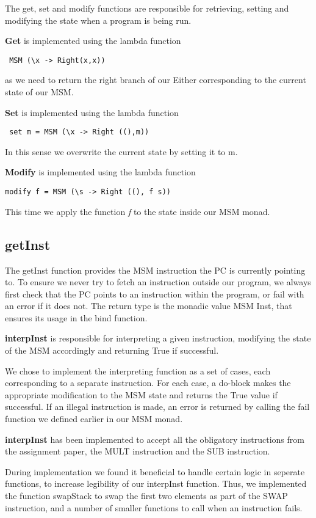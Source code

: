 \documentclass[]{article}
\begin{document}
The get, set and modify functions are responsible for retrieving, setting and modifying the state when a program is being run.\par

\textbf{Get} is implemented using the lambda function\begin{verbatim} MSM (\x -> Right(x,x)) \end{verbatim}as we need to return the right branch of our Either corresponding to the current state of our MSM.\par
\textbf{Set} is implemented using the lambda function\begin{verbatim} set m = MSM (\x -> Right ((),m))\end{verbatim} 
In this sense we overwrite the current state by setting it to m.\par
\textbf{Modify} is implemented using the lambda function \begin{verbatim}modify f = MSM (\s -> Right ((), f s))\end{verbatim} 
This time we apply the function \emph{f} to the state inside our MSM monad. \par

\subsection{getInst}

The getInst function provides the MSM instruction the PC is currently pointing to. To ensure we never try to fetch an instruction outside our program, we always first check that the PC points to an instruction within the program, or fail with an error if it does not. The return type is the monadic value MSM Inst, that ensures its usage in the bind function.\par
\textbf{interpInst} is responsible for interpreting a given instruction, modifying the state of the MSM accordingly and returning True if successful.\par

We chose to implement the interpreting function as a set of cases, each corresponding to a separate instruction. For each case, a do-block makes the appropriate modification to the MSM state and returns the True value if successful. If an illegal instruction is made, an error is returned by calling the fail function we defined earlier in our MSM monad.\par
\textbf{interpInst} has been implemented to accept all the obligatory instructions from the assignment paper, the MULT instruction and the SUB instruction.\par
During implementation we found it beneficial to handle certain logic in seperate functions, to increase legibility of our interpInst function. Thus, we implemented the function swapStack to swap the first two elements as part of the SWAP instruction, and a number of smaller functions to call when an instruction fails.\par
\end{document}
